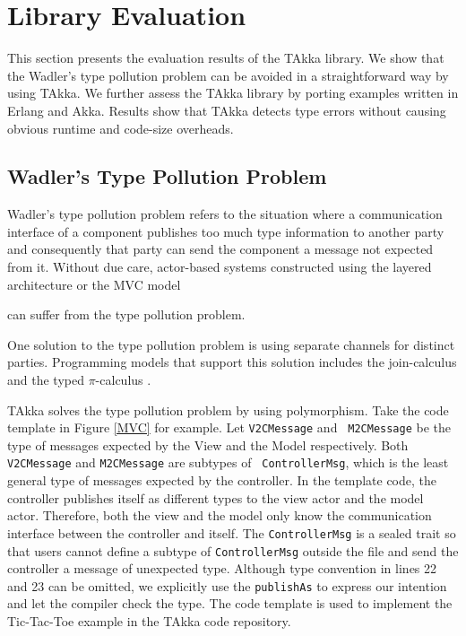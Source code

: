


\section{Library Evaluation}

This section presents the evaluation results of the TAkka library.  
We show that the Wadler's type pollution problem can be avoided 
in a straightforward way by using TAkka. We further assess the TAkka library by 
porting examples written in Erlang and Akka.  Results show that TAkka 
detects type errors without causing obvious runtime and code-size overheads.



\subsection{Wadler\rq{}s Type Pollution Problem}
\label{type_pollution}

Wadler\rq{}s type pollution problem refers to the situation where a
communication interface of a component publishes too much type information to 
another party and consequently that party can send the component a message not
expected from it.  Without due care, actor-based systems constructed using the
layered architecture or the MVC model  
can suffer from the type pollution problem.

One solution to the type pollution problem is using separate channels for
distinct parties.  Programming models that support this solution includes the
join-calculus \citep{full_join} and the typed $\pi$-calculus \citep{pi_book}.

TAkka solves the type pollution problem by using polymorphism.  Take the
code template in Figure \ref{MVC} for example. Let {\tt V2CMessage} and {\tt 
M2CMessage} be the type of messages expected by the View and the Model
respectively.  Both {\tt V2CMessage} and {\tt M2CMessage} are subtypes of {\tt
ControllerMsg}, which is the least general type of messages expected by the 
controller. In the template code, the controller publishes itself as different 
types to the view actor and the model actor.  Therefore, both the view and the
model only know the communication interface between the controller and itself.
The {\tt ControllerMsg} is a sealed trait so that users cannot define a 
subtype of 
{\tt ControllerMsg} outside the file and send the controller a message of 
unexpected type.  Although type convention in lines 22 and 23 can be 
omitted, we explicitly use the {\tt publishAs} to express our intention and 
let the compiler check the type.  The code template is used to implement the 
Tic-Tac-Toe example in the TAkka code repository.

